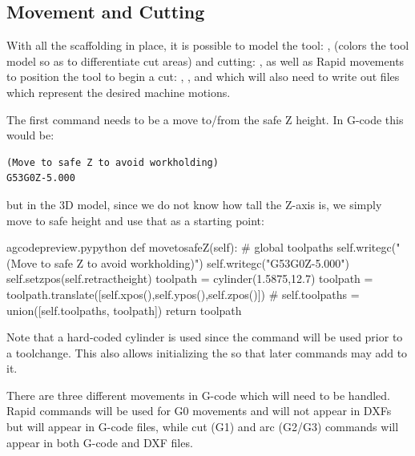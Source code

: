 \documentclass{ltxdoc}
\begin{document}
%
 
\subsection{Movement and Cutting}

With all the scaffolding in place, it is possible to model the tool: , (colors the tool model so as to differentiate cut areas) and cutting: , as well as Rapid movements to position the tool to begin a cut: , , and  which will also need to write out files which represent the desired machine motions.

The first command needs to be a move to/from the safe Z height. In G-code this would be:

\begin{verbatim}
(Move to safe Z to avoid workholding)
G53G0Z-5.000
\end{verbatim}

but in the 3D model, since we do not know how tall the Z-axis is, we simply move to safe height and use that as a starting point:

\lstset{firstnumber=\thegcpy}
\begin{writecode}{a}{gcodepreview.py}{python}
    def movetosafeZ(self):
#        global toolpaths
        self.writegc("(Move to safe Z to avoid workholding)")
        self.writegc("G53G0Z-5.000")
        self.setzpos(self.retractheight)
        toolpath = cylinder(1.5875,12.7)
        toolpath = toolpath.translate([self.xpos(),self.ypos(),self.zpos()])
#        self.toolpaths = union([self.toolpaths, toolpath])
        return toolpath
        
\end{writecode}
\addtocounter{gcpy}{10}

Note that a hard-coded cylinder is used since the command will be used prior to a toolchange. This also allows initializing the  so that later commands may add to it.

There are three different movements in G-code which will need to be handled. Rapid commands will be used for G0 movements and will not appear in DXFs but will appear in G-code files, while cut (G1) and arc (G2/G3) commands will appear in both G-code and DXF files. 
\end{document}
